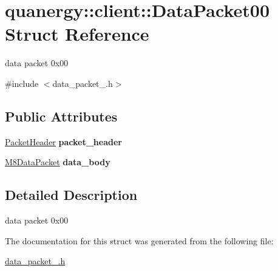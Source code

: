 \hypertarget{structquanergy_1_1client_1_1DataPacket00}{\section{quanergy\-:\-:client\-:\-:Data\-Packet00 Struct Reference}
\label{structquanergy_1_1client_1_1DataPacket00}
}


data packet 0x00  




{\ttfamily \#include $<$data\-\_\-packet\-\_.\-h$>$}

\subsection*{Public Attributes}
\begin{DoxyCompactItemize}
\item 
\hypertarget{structquanergy_1_1client_1_1DataPacket00_a0768e7de1199c15cb4aeedc7ff4673ba}{\hyperlink{structquanergy_1_1client_1_1PacketHeader}{Packet\-Header} {\bfseries packet\-\_\-header}}\label{structquanergy_1_1client_1_1DataPacket00_a0768e7de1199c15cb4aeedc7ff4673ba}

\item 
\hypertarget{structquanergy_1_1client_1_1DataPacket00_a80af92e8680baa5d113c6d1a6ab7cd8d}{\hyperlink{structquanergy_1_1client_1_1M8DataPacket}{M8\-Data\-Packet} {\bfseries data\-\_\-body}}\label{structquanergy_1_1client_1_1DataPacket00_a80af92e8680baa5d113c6d1a6ab7cd8d}

\end{DoxyCompactItemize}


\subsection{Detailed Description}
data packet 0x00 

The documentation for this struct was generated from the following file\-:\begin{DoxyCompactItemize}
\item 
\hyperlink{data__packet__00_8h}{data\-\_\-packet\-\_.\-h}\end{DoxyCompactItemize}
